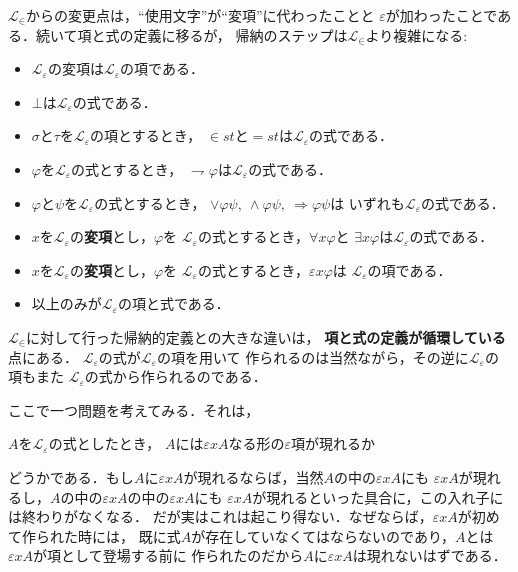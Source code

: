 	$\mathcal{L}_{\in}$からの変更点は，``使用文字''が``変項''に代わったことと
	$\varepsilon$が加わったことである．続いて項と式の定義に移るが，
	帰納のステップは$\mathcal{L}_{\in}$より複雑になる:
	
	\begin{itemize}
		\item $\mathcal{L}_{\varepsilon}$の変項は$\mathcal{L}_{\varepsilon}$の項である．
		\item $\bot$は$\mathcal{L}_{\varepsilon}$の式である．
		\item $\sigma$と$\tau$を$\mathcal{L}_{\varepsilon}$の項とするとき，
			$\in st$と$=st$は$\mathcal{L}_{\varepsilon}$の式である．
		\item $\varphi$を$\mathcal{L}_{\varepsilon}$の式とするとき，
			$\rightharpoondown \varphi$は$\mathcal{L}_{\varepsilon}$の式である．
		\item $\varphi$と$\psi$を$\mathcal{L}_{\varepsilon}$の式とするとき，
			$\vee \varphi \psi,\ \wedge \varphi \psi,\ \Longrightarrow \varphi \psi$は
			いずれも$\mathcal{L}_{\varepsilon}$の式である．
		\item $x$を$\mathcal{L}_{\varepsilon}$の{\bf 変項}とし，$\varphi$を
			$\mathcal{L}_{\varepsilon}$の式とするとき，$\forall x \varphi$と
			$\exists x \varphi$は$\mathcal{L}_{\varepsilon}$の式である．
		\item $x$を$\mathcal{L}_{\varepsilon}$の{\bf 変項}とし，$\varphi$を
			$\mathcal{L}_{\varepsilon}$の式とするとき，$\varepsilon x \varphi$は
			$\mathcal{L}_{\varepsilon}$の項である．
		\item 以上のみが$\mathcal{L}_{\varepsilon}$の項と式である．
	\end{itemize}
	
	$\mathcal{L}_{\in}$に対して行った帰納的定義との大きな違いは，
	{\bf 項と式の定義が循環している}点にある．
	$\mathcal{L}_{\varepsilon}$の式が$\mathcal{L}_{\varepsilon}$の項を用いて
	作られるのは当然ながら，その逆に$\mathcal{L}_{\varepsilon}$の項もまた
	$\mathcal{L}_{\varepsilon}$の式から作られるのである．
	
	ここで一つ問題を考えてみる．それは，
	\begin{screen}
		$A$を$\mathcal{L}_{\varepsilon}$の式としたとき，
		$A$には$\varepsilon x A$なる形の$\varepsilon$項が現れるか
	\end{screen}
	どうかである．もし$A$に$\varepsilon x A$が現れるならば，当然$A$の中の$\varepsilon x A$にも
	$\varepsilon x A$が現れるし，$A$の中の$\varepsilon x A$の中の$\varepsilon x A$にも
	$\varepsilon x A$が現れるといった具合に，この入れ子には終わりがなくなる．
	だが実はこれは起こり得ない．なぜならば，$\varepsilon x A$が初めて作られた時には，
	既に式$A$が存在していなくてはならないのであり，$A$とは$\varepsilon x A$が項として登場する前に
	作られたのだから$A$に$\varepsilon x A$は現れないはずである．
	
